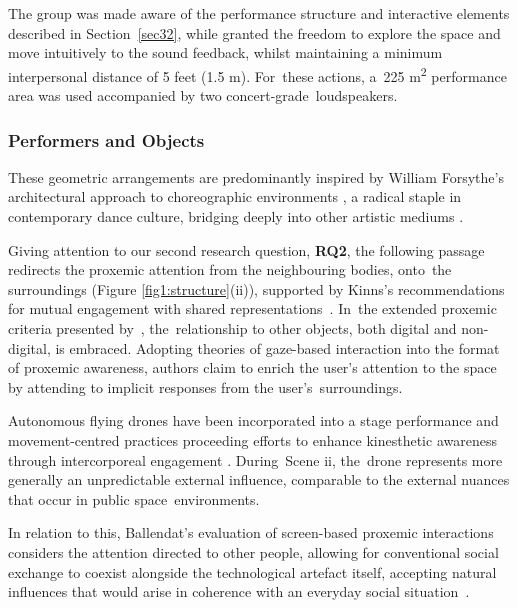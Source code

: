 The group was made aware of the performance structure and interactive elements described in Section~\ref{sec32}, while granted the freedom to explore the space and move intuitively to the sound feedback, whilst maintaining a minimum interpersonal distance of 5 feet (1.5 m). For~these actions, a~225 m\textsuperscript{2} performance area was used accompanied by two concert-grade~loudspeakers.

\subsubsection*{Performers and Objects}
\label{sec:structure_2}

These geometric arrangements are predominantly inspired by William Forsythe's architectural approach to choreographic environments \citep{forsythe_dance_1999}, a radical staple in contemporary dance culture, bridging deeply into other artistic mediums \citep{clark_geometry_2014}.

Giving attention to our second research question, \textbf{RQ2}, the following passage redirects the proxemic attention from the neighbouring bodies, onto~the surroundings (Figure \ref{fig1:structure}(ii)), supported by Kinns's
recommendations for mutual engagement with shared representations~\cite{bryan-kinns_mutual_2013}. In~the extended proxemic criteria presented by~\cite{ballendat_proxemic_2010}, the~relationship to other objects, both digital and non-digital, is embraced. Adopting theories of gaze-based interaction into the format of proxemic awareness, authors claim to enrich the user's attention to the space by attending to implicit responses from the user's~surroundings.

Autonomous flying drones have been incorporated into a stage performance \citep{eriksson_dancing_2019} and movement-centred practices \citep{la_delfa_drone_2020} proceeding efforts to enhance kinesthetic awareness through intercorporeal engagement \citep{tezza_state---art_2019}. During~Scene ii, the~drone represents more generally an unpredictable external influence, comparable to the external nuances that occur in public space~environments.

In relation to this, Ballendat's %
evaluation of screen-based proxemic interactions considers the attention directed to other people, allowing for conventional social exchange to coexist alongside the technological artefact itself, accepting natural influences that would arise in coherence with an everyday social situation~\cite{ballendat_proxemic_2010}.


